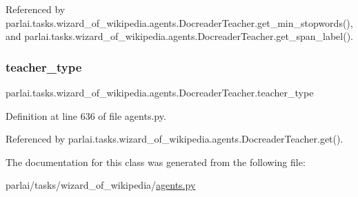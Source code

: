Referenced by parlai.\+tasks.\+wizard\+\_\+of\+\_\+wikipedia.\+agents.\+Docreader\+Teacher.\+get\+\_\+min\+\_\+stopwords(), and parlai.\+tasks.\+wizard\+\_\+of\+\_\+wikipedia.\+agents.\+Docreader\+Teacher.\+get\+\_\+span\+\_\+label().

\mbox{\label{classparlai_1_1tasks_1_1wizard__of__wikipedia_1_1agents_1_1DocreaderTeacher_a4582a196ca5c413be227f84c48afb4b5}} 
\subsubsection{\texorpdfstring{teacher\+\_\+type}{teacher\_type}}
{\footnotesize\ttfamily parlai.\+tasks.\+wizard\+\_\+of\+\_\+wikipedia.\+agents.\+Docreader\+Teacher.\+teacher\+\_\+type}



Definition at line 636 of file agents.\+py.



Referenced by parlai.\+tasks.\+wizard\+\_\+of\+\_\+wikipedia.\+agents.\+Docreader\+Teacher.\+get().



The documentation for this class was generated from the following file\+:\begin{DoxyCompactItemize}
\item 
parlai/tasks/wizard\+\_\+of\+\_\+wikipedia/\hyperlink{parlai_2tasks_2wizard__of__wikipedia_2agents_8py}{agents.\+py}\end{DoxyCompactItemize}
